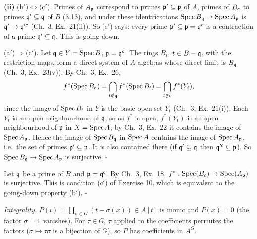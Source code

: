 \documentclass[11pt]{article}
\begin{document}
\textbf{(ii)} (b$'$)$\Leftrightarrow$(c$'$). Primes of $A_\mathfrak p$ correspond to primes $\mathfrak p'\subseteq\mathfrak p$ of $A$, primes of $B_\mathfrak q$ to primes $\mathfrak q'\subseteq\mathfrak q$ of $B$ (3.13), and under these identifications $\operatorname{Spec} B_\mathfrak q\to\operatorname{Spec} A_\mathfrak p$ is $\mathfrak q'\mapsto\mathfrak q'^c$ (Ch.~3, Ex.~21(ii)). So (c$'$) says: every prime $\mathfrak p'\subseteq\mathfrak p=\mathfrak q^c$ is a contraction of a prime $\mathfrak q'\subseteq\mathfrak q$. This is going-down.

(a$'$)$\Rightarrow$(c$'$). Let $\mathfrak q\in Y=\operatorname{Spec} B$, $\mathfrak p=\mathfrak q^c$. The rings $B_t$, $t\in B-\mathfrak q$, with the restriction maps, form a direct system of $A$-algebras whose direct limit is $B_\mathfrak q$ (Ch.~3, Ex.~23(v)). By Ch.~3, Ex.~26,
\[
f^*(\operatorname{Spec} B_\mathfrak q)=\bigcap_{t\notin\mathfrak q}f^*(\operatorname{Spec} B_t)=\bigcap_{t\notin\mathfrak q}f^*(Y_t),
\]
since the image of $\operatorname{Spec} B_t$ in $Y$ is the basic open set $Y_t$ (Ch.~3, Ex.~21(i)). Each $Y_t$ is an open neighbourhood of $\mathfrak q$, so as $f^*$ is open, $f^*(Y_t)$ is an open neighbourhood of $\mathfrak p$ in $X=\operatorname{Spec} A$; by Ch.~3, Ex.~22 it contains the image of $\operatorname{Spec} A_\mathfrak p$. Hence the image of $\operatorname{Spec} B_\mathfrak q$ in $\operatorname{Spec} A$ contains the image of $\operatorname{Spec} A_\mathfrak p$, i.e.\ the set of primes $\mathfrak p'\subseteq\mathfrak p$. It is also contained there (if $\mathfrak q'\subseteq\mathfrak q$ then $\mathfrak q'^c\subseteq\mathfrak p$). So $\operatorname{Spec} B_\mathfrak q\to\operatorname{Spec} A_\mathfrak p$ is surjective. \hfill$\square$

\pf
Let $\mathfrak q$ be a prime of $B$ and $\mathfrak p=\mathfrak q^c$. By Ch.~3, Ex.~18, $f^*:\operatorname{Spec}(B_\mathfrak q)\to\operatorname{Spec}(A_\mathfrak p)$ is surjective. This is condition (c$'$) of Exercise 10, which is equivalent to the going-down property (b$'$). \hfill$\square$

\pf
\emph{Integrality.} $P(t)=\prod_{\sigma\in G}(t-\sigma(x))\in A[t]$ is monic and $P(x)=0$ (the factor $\sigma=1$ vanishes). For $\tau\in G$, $\tau$ applied to the coefficients permutes the factors ($\sigma\mapsto\tau\sigma$ is a bijection of $G$), so $P$ has coefficients in $A^G$.
\end{document}
